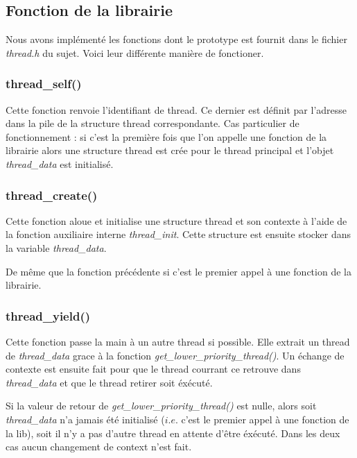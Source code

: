 \subsection{Fonction de la librairie}
Nous avons implémenté les fonctions dont le prototype est fournit dans
le fichier \textit{thread.h} du sujet. Voici leur différente manière
de fonctioner.

\subsubsection{thread\_self()}
Cette fonction renvoie l'identifiant de thread. Ce dernier est définit
par l'adresse dans la pile de la structure thread correspondante.
Cas particulier de fonctionnement : si c'est la première fois que l'on
appelle une fonction de la librairie alors une structure thread est
crée pour le thread principal et l'objet \textit{thread\_data} est
initialisé.

\subsubsection{thread\_create()}
Cette fonction aloue et initialise une structure thread et son
contexte à l'aide de la fonction auxiliaire interne
\textit{thread\_init}.  Cette structure est ensuite stocker dans la
variable \textit{thread\_data}.

De même que la fonction précédente si c'est le
premier appel à une fonction de la librairie.



\subsubsection{thread\_yield()}
Cette fonction passe la main à un autre thread si possible. Elle
extrait un thread de \textit{thread\_data} grace à la fonction
\textit{get\_lower\_priority\_thread()}. Un échange de contexte est
ensuite fait pour que le thread courrant ce retrouve dans
\textit{thread\_data} et que le thread retirer soit éxécuté.

Si la valeur de retour de \textit{get\_lower\_priority\_thread()} est
nulle, alors soit \textit{thread\_data} n'a jamais été initialisé
($i.e.$ c'est le premier appel à une fonction de la lib), soit il n'y
a pas d'autre thread en attente d'être éxécuté. Dans les deux cas
aucun changement de context n'est fait.


